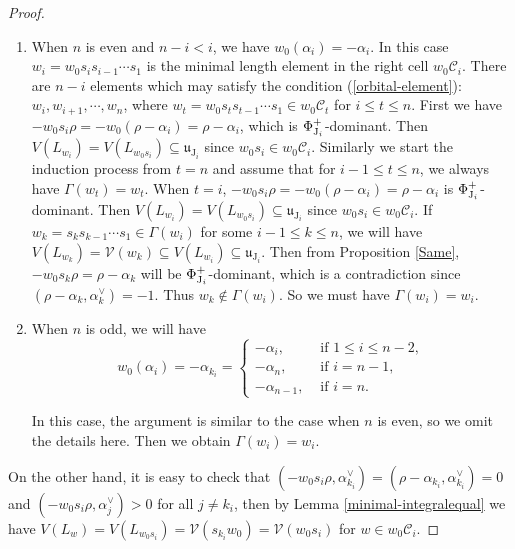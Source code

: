 \documentclass[11pt, reqno]{amsart}
\newcommand{\fru}{\mathfrak{u}}
\renewcommand{\subset}{\subseteq}
\theoremstyle{definition}
\numberwithin{equation}{section}
\begin{document}
\begin{proof}
\begin{enumerate}
\item When $n$ is even  and $n-i< i$, we have $w_0(\alpha_i)=-\alpha_i$. In this case $w_i=w_0s_is_{i-1}\cdots s_{1}$ is the minimal length element in the right cell $w_0\mathcal{C}_i$. There are $n-i$ elements which may satisfy the condition (\ref{orbital-element}): $w_i,w_{i+1},\cdots, w_n$, where $w_t=w_0s_ts_{t-1}\cdots s_1\in w_0\mathcal{C}_t$ for $i\leq t\leq n$. First we have $-w_0s_i\rho=-w_0(\rho-\alpha_i)=\rho-\alpha_{i}$, which is $\Phi_{{\rm J}_{i}}^+$-dominant. Then $V(L_{w_i})=V(L_{w_0s_i})\subset \fru_{\operatorname{J}_i}$ since $w_0s_i\in w_0\mathcal{C}_i$. Similarly we start the induction process from $t=n$ and assume that for $i-1\leq t\leq n$, we always have $\Gamma(w_{t})=w_{t}$. 
When $t=i$, $-w_0s_i\rho=-w_0(\rho-\alpha_i)=\rho-\alpha_{i}$ is $\Phi_{{\rm J}_{i}}^+$-dominant. Then $V(L_{w_i})=V(L_{w_0s_i})\subset \fru_{\operatorname{J}_i}$ since $w_0s_i\in w_0\mathcal{C}_i$. If $w_k=s_ks_{k-1}\cdots s_{1}\in\Gamma(w_i)$ for some $i-1\leq k\leq n$, we will have $V(L_{w_k})=\mathcal{V}(w_k)\subset V(L_{w_i})\subset\fru_{\operatorname{J}_i}$. Then from Proposition \ref{Same}, $-w_0s_k\rho=\rho-\alpha_k$ will be  $\Phi_{{\rm J}_i}^+$-dominant, which is a contradiction since $(\rho-\alpha_k,\alpha^{\vee}_k)=-1$. Thus $w_k\notin \Gamma(w_i)$. So we must have $\Gamma(w_i)=w_i$.





\item When $n$ is odd, we will have 
\[
w_0(\alpha_i)=-\alpha_{k_i}=\begin{cases}
    -\alpha_i, & \text{~if~} 1\leq i\leq n-2,\\
    -\alpha_n,& \text{~if~} i=n-1,\\
    -\alpha_{n-1}, &\text{~if~} i=n.
\end{cases}
\]




In this case, the argument is similar to the case when $n$ is even, so we omit the details here. Then we obtain $\Gamma(w_i) = w_i$.

 \end{enumerate}
 
 On the other hand, it is easy to check that $(-w_0s_i\rho,\alpha_{k_i}^{\vee})=(\rho-\alpha_{k_i},\alpha_{k_i}^{\vee})=0$  and $(-w_0s_i\rho,\alpha_j^{\vee})>0$ for all $j\neq k_i$, then by Lemma \ref{minimal-integralequal} we have $V(L_w)=V(L_{w_0s_i})=\mathcal V(s_{k_i}w_0)=\mathcal V(w_0s_i)$ for $w\in w_0\mathcal{C}_i$.



 
\end{proof}
\end{document}
